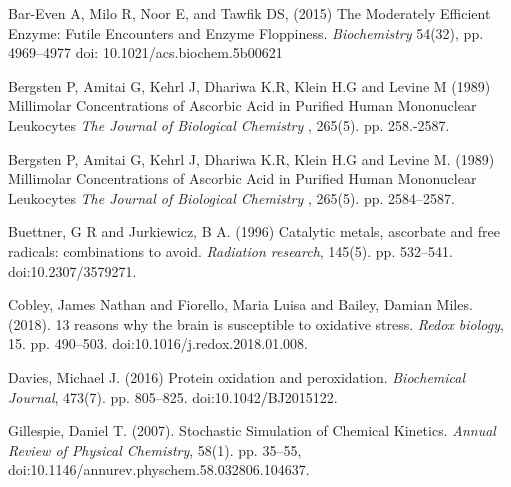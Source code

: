 \documentclass[preprint,12pt,authoryear]{elsarticle}
\begin{document}
\begin{thebibliography}{00}



%

Bar-Even A, Milo R, Noor E, and Tawfik DS,
(2015)
The Moderately Efficient Enzyme: Futile Encounters and Enzyme Floppiness.
{\em Biochemistry} 54(32), 
pp. 4969--4977
doi: 10.1021/acs.biochem.5b00621 

Bergsten P, Amitai G, Kehrl J, Dhariwa K.R, Klein H.G and Levine M
(1989)
Millimolar Concentrations of Ascorbic Acid in Purified Human Mononuclear Leukocytes
{ \em The Journal of Biological Chemistry },  265(5).
pp. 258.-2587.

Bergsten P, Amitai G, Kehrl J, Dhariwa K.R, Klein H.G and Levine M.
(1989)
Millimolar Concentrations of Ascorbic Acid in Purified Human Mononuclear Leukocytes
{ \em The Journal of Biological Chemistry },  265(5).
pp. 2584--2587.


Buettner, G R and Jurkiewicz, B A.
(1996)
Catalytic metals, ascorbate and free radicals: combinations to avoid.
{\em Radiation research}, 145(5).
pp. 532--541.
doi:10.2307/3579271.







Cobley, James Nathan and Fiorello, Maria Luisa and Bailey, Damian Miles.
(2018).
13 reasons why the brain is susceptible to oxidative stress.
{ \em Redox biology},  15.
pp. 490--503.
doi:10.1016/j.redox.2018.01.008.


Davies, Michael J.
(2016)
Protein oxidation and peroxidation.
{ \em Biochemical Journal}, 473(7).
pp. {805--825}.
doi:10.1042/BJ2015122.





Gillespie, Daniel T.
(2007).
Stochastic Simulation of Chemical Kinetics.
{ \em Annual Review of Physical Chemistry},  58(1).
pp.  {35--55},
doi:10.1146/annurev.physchem.58.032806.104637.



\end{thebibliography}
\end{document}

